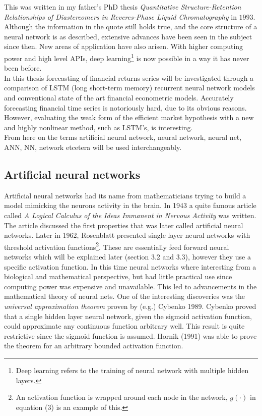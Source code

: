 \documentclass[12pt, letterpaper]{amsart}%
\begin{document}
This was written in my father's PhD thesis \textit{Quantitative Structure-Retention Relationships of Diastereomers in Reveres-Phase Liquid Chromatography} in $1993$. Although the information in the quote still holds true, and the core structure of a neural network is as described, extensive advances have been seen in the subject since then. New areas of application have also arisen. With higher computing power and high level APIs, deep learning\footnote{Deep learning refers to the training of neural network with multiple hidden layers.} is now possible in a way it has never been before.
\\

In this thesis forecasting of financial returns series will be investigated through a comparison of LSTM (long short-term memory) recurrent neural network models and conventional state of the art financial econometric models. Accurately forecasting financial time series is notoriously hard, due to its obvious reasons. However, evaluating the weak form of the efficient market hypothesis with a new and highly nonlinear method, such as LSTM's, is interesting.
\\

From here on the terms artificial neural network, neural network, neural net, ANN, NN, network etcetera will be used interchangeably.

\subsection{Artificial neural networks}
Artificial neural networks had its name from mathematicians trying to build a model mimicking the neurons activity in the brain. In 1943 a quite famous article called \textit{A Logical Calculus of the Ideas Immanent in Nervous Activity} was written. The article discussed the first properties that was later called artificial neural networks. Later in 1962, Rosenblatt presented single layer neural networks with threshold activation functions\footnote{An activation function is wrapped around each node in the network, $g(\cdot)$ in equation (3) is an example of this.}. These are essentially feed forward neural networks which will be explained later (section 3.2 and 3.3), however they use a specific activation function. In this time neural networks where interesting from a biological and mathematical perspective, but had little practical use since computing power was expensive and unavailable. This led to advancements in the mathematical theory of neural nets. One of the interesting discoveries was the \textit{universal approximation theorem} proven by (e.g.) Cybenko 1989. Cybenko proved that a single hidden layer neural network, given the sigmoid activation function, could approximate any continuous function arbitrary well. This result is quite restrictive since the sigmoid function is assumed. Hornik (1991) was able to prove the theorem for an arbitrary bounded activation function.
\\
\end{document}
